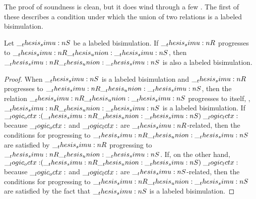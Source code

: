


The proof of soundness is clean, but it does wind through a few .
The first of these describes a condition under which the union of two relations is a labeled bisimulation.
%
\begin{lemma}\label{lem:labeled-bisim-union}
  Let $\__thesis_simu:n {S}$ be a labeled bisimulation.
  If $\__thesis_simu:n {R}$ progresses to $\__thesis_simu:n {R} \__thesis_union: \__thesis_simu:n {S}$, then $\__thesis_simu:n {R} \__thesis_union: \__thesis_simu:n {S}$ is also a labeled bisimulation.
\end{lemma}
\begin{proof}
  When $\__thesis_simu:n {S}$ is a labeled bisimulation and $\__thesis_simu:n {R}$ progresses to $\__thesis_simu:n {R} \__thesis_union: \__thesis_simu:n {S}$, then the relation $\__thesis_simu:n {R} \__thesis_union: \__thesis_simu:n {S}$ progresses to itself, \ie, $\__thesis_simu:n {R} \__thesis_union: \__thesis_simu:n {S}$ is 
  a labeled bisimulation.
  If $\__logic_octx: \mathrel{(\__thesis_simu:n {R} \__thesis_union: \__thesis_simu:n {S})} \__logic_lctx:$ because $\__logic_octx:$ and $\__logic_lctx:$ are $\__thesis_simu:n {R}$-related, then the conditions for progressing to $\__thesis_simu:n {R} \__thesis_union: \__thesis_simu:n {S}$ are satisfied by $\__thesis_simu:n {R}$ progressing to $\__thesis_simu:n {R} \__thesis_union: \__thesis_simu:n {S}$.
  If, on the other hand, $\__logic_octx: \mathrel{(\__thesis_simu:n {R} \__thesis_union: \__thesis_simu:n {S})} \__logic_lctx:$ because $\__logic_octx:$ and $\__logic_lctx:$ are $\__thesis_simu:n {S}$-related, then the conditions for progressing to $\__thesis_simu:n {R} \__thesis_union: \__thesis_simu:n {S}$ are satisfied by the fact that $\__thesis_simu:n {S}$ is a labeled bisimulation.
\end{proof}

